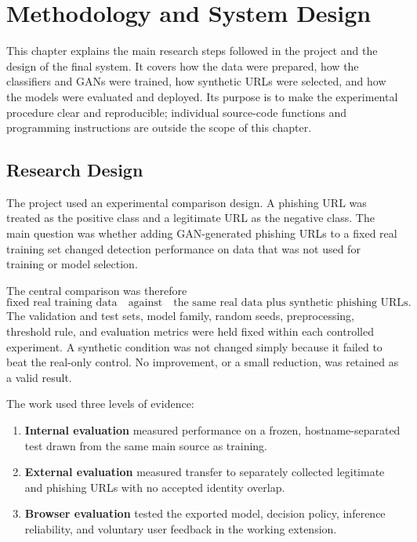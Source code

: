 \chapter{Methodology and System Design}
\label{chap:methodology}

This chapter explains the main research steps followed in the project and the
design of the final system. It covers how the data were prepared, how the
classifiers and GANs were trained, how synthetic URLs were selected, and how
the models were evaluated and deployed. Its purpose is to make the experimental
procedure clear and reproducible; individual source-code functions and
programming instructions are outside the scope of this chapter.

\section{Research Design}

The project used an experimental comparison design. A phishing URL was treated
as the positive class and a legitimate URL as the negative class. The main
question was whether adding GAN-generated phishing URLs to a fixed real
training set changed detection performance on data that was not used for
training or model selection.

The central comparison was therefore
\begin{equation}
    \text{fixed real training data}
    \quad\text{against}\quad
    \text{the same real data plus synthetic phishing URLs}.
    \label{eq:method-main-comparison}
\end{equation}
The validation and test sets, model family, random seeds, preprocessing,
threshold rule, and evaluation metrics were held fixed within each controlled
experiment. A synthetic condition was not changed simply because it failed to
beat the real-only control. No improvement, or a small reduction, was retained
as a valid result.

The work used three levels of evidence:

\begin{enumerate}
    \item \textbf{Internal evaluation} measured performance on a frozen,
    hostname-separated test drawn from the same main source as training.

    \item \textbf{External evaluation} measured transfer to separately
    collected legitimate and phishing URLs with no accepted identity overlap.

    \item \textbf{Browser evaluation} tested the exported model, decision
    policy, inference reliability, and voluntary user feedback in the working
    extension.
\end{enumerate}

